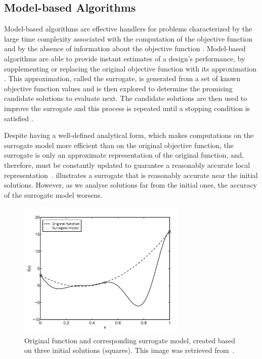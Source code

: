 	\subsection{Model-based Algorithms}
	\label{ssec:model-based}
	Model-based algorithms are effective handlers for problems characterized by the large time complexity associated with the computation of the objective function and by the absence of information about the objective function \cite{Forrester2009SBO}. Model-based algorithms are able to provide instant estimates of a design’s performance, by supplementing or replacing the original objective function with its approximation \cite{Wortmann2016BBO}. This approximation, called the surrogate, is generated from a set of known objective function values and is then explored to determine the promising candidate solutions to evaluate next. The candidate solutions are then used to improve the surrogate and this process is repeated until a stopping condition is satisfied \cite{Koziel2011}.
	
	Despite having a well-defined analytical form, which makes computations on the surrogate model more efficient than on the original objective function, the surrogate is only an approximate representation of the original function, and, therefore, must be constantly updated to guarantee a reasonably accurate local representation~\cite{Koziel2011}.  illustrates a surrogate that is reasonably accurate near the initial solutions. However, as we analyse solutions far from the initial ones, the accuracy of the surrogate model worsens.
	\begin{figure}[h!]
		\centering
		\includegraphics[width=8cm]{Images/Background/sbosexample.JPG}
		\caption[Example of a surrogate model]{Original function and corresponding surrogate model, created based on three initial solutions (squares). This image was retrieved from~\cite{Koziel2011}.}
		\label{fig:sbosexample}
	\end{figure}
	
